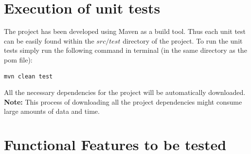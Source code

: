 \documentclass[11pt,a4paper]{article}
\begin{document}
\section{Execution of unit tests}	
The project has been developed using Maven as a build tool. Thus each unit test can be easily found within the $src/test$ directory of the project. To run the unit tests simply run the following command in terminal (in the same directory as the pom file): \\

\begin{lstlisting}
mvn clean test
\end{lstlisting}
All the necessary dependencies for the project will be automatically downloaded.\\ \textbf{Note:} This process of downloading all the project dependencies might consume large amounts of data and time.

\section{Functional Features to be tested}
%	 
\end{document}

